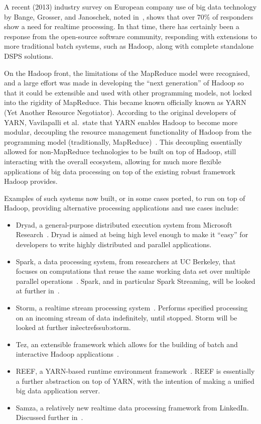 \documentclass[a4paper,11pt]{article}
\begin{document}
A recent (2013) industry survey on European company use of big data technology by Bange, Grosser, and Janoschek, noted
in~\cite{industry_bd_survey}, shows that over 70\% of responders show a need for realtime processing. In that time,
there has certainly been a response from the open-source software community, responding with extensions to more
traditional batch systems, such as Hadoop, along with complete standalone DSPS solutions.

On the Hadoop front, the limitations of the MapReduce model were recognised, and a large effort was made in developing
the ``next generation'' of Hadoop so that it could be extensible and used with other programming models, not locked into
the rigidity of MapReduce. This became known officially known as YARN (Yet Another Resource Negotiator). According to
the original developers of YARN, Vavilapalli et al.\ state that YARN enables Hadoop to become more modular, decoupling
the resource management functionality of Hadoop from the programming model (traditionally, MapReduce)~\cite{vavilapalli2013apache}.
This decoupling essentially allowed for non-MapReduce technologies to be built on top of Hadoop, still interacting with the
overall ecosystem, allowing for much more flexible applications of big data processing on top of the existing robust
framework Hadoop provides.

Examples of such systems now built, or in some cases ported, to run on top of Hadoop, providing alternative processing
applications and use cases include:

\begin{itemize}
  \item Dryad, a general-purpose distributed execution system from Microsoft Research~\cite{isard2007dryad}. Dryad is
  aimed at being high level enough to make it ``easy'' for developers to write highly distributed and parallel applications.
  \item Spark, a data processing system, from researchers at UC Berkeley, that focuses on computations that reuse the same working data set over multiple
  parallel operations~\cite{zaharia2010spark}. Spark, and in particular Spark Streaming, will be looked at further in~.
  \item Storm, a realtime stream processing system~\cite[p.\ 244]{murthy2013apache}. Performs specified processing on an
  incoming stream of data indefinitely, until stopped. Storm will be looked at further in\~sectref{ssub:storm}.
  \item Tez, an extensible framework which allows for the building of batch and interactive Hadoop applications~\cite{web_tez}.
  \item REEF, a YARN-based runtime environment framework~\cite{chun2013reef}. REEF is essentially a further abstraction
  on top of YARN, with the intention of making a unified big data application server.
  \item Samza, a relatively new realtime data processing framework from LinkedIn. Discussed further in~.
\end{itemize}
\end{document}
